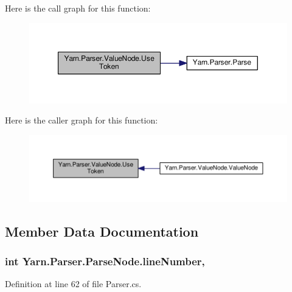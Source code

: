 Here is the call graph for this function\-:
\nopagebreak
\begin{figure}[H]
\begin{center}
\leavevmode
\includegraphics[width=350pt]{a00188_a7be6a979ee21b2d07ce541fb9c5b52df_cgraph}
\end{center}
\end{figure}




Here is the caller graph for this function\-:
\nopagebreak
\begin{figure}[H]
\begin{center}
\leavevmode
\includegraphics[width=350pt]{a00188_a7be6a979ee21b2d07ce541fb9c5b52df_icgraph}
\end{center}
\end{figure}




\subsection{Member Data Documentation}
\hypertarget{a00148_a18b493382de0fde5b4299c1bd2250075}{
\subsubsection[{line\-Number}]{\setlength{\rightskip}{0pt plus 5cm}int Yarn.\-Parser.\-Parse\-Node.\-line\-Number\hspace{0.3cm}{\ttfamily [package]}, {\ttfamily [inherited]}}}\label{a00148_a18b493382de0fde5b4299c1bd2250075}


Definition at line 62 of file Parser.\-cs.



